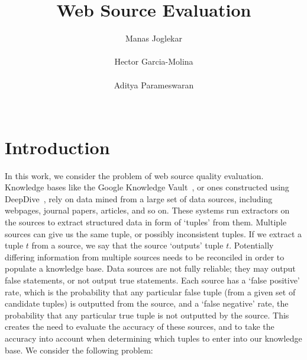 \documentclass{sig-alternate}
\newcounter{prob}
\begin{document}
\title{Web Source Evaluation}
\author{
\alignauthor
Manas Joglekar\\
       \\
\alignauthor
Hector Garcia-Molina\\
       \\
\alignauthor 
Aditya Parameswaran\\
       \\
}
\maketitle

\begin{abstract}
\end{abstract}


\section{Introduction}
In this work, we consider the problem of web source quality evaluation. Knowledge bases like the Google Knowledge Vault~\cite{Dong:2014:KVW:2623330.2623623}, or ones constructed using DeepDive~\cite{Niu_deepdive:web-scale}, rely on data mined from a large set of data sources, including webpages, journal papers, articles, and so on. These systems run extractors on the sources to extract structured data in form of `tuples' from them. Multiple sources can give us the same tuple, or possibly inconsistent tuples. If we extract a tuple $t$ from a source, we say that the source `outputs' tuple $t$. Potentially differing information from multiple sources needs to be reconciled in order to populate a knowledge base. Data sources are not fully reliable; they may output false statements, or not output true statements. Each source has a `false positive' rate, which is the probability that any particular false tuple (from a given set of candidate tuples) is outputted from the source, and a `false negative' rate, the probability that any particular true tuple is not outputted by the source. This creates the need to evaluate the accuracy of these sources, and to take the accuracy into account when determining which tuples to enter into our knowledge base. We consider the following problem:
\end{document}
